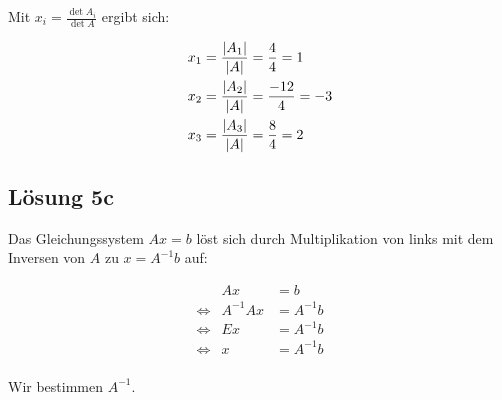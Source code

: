 \documentclass[main.tex]{subfiles}
\begin{document}
Mit $x_i = \frac{\det A_i}{\det A}$ ergibt sich:

\begin{align*}
    x_1 &= \frac{\lvert A_1\rvert}{\lvert A\rvert} = \frac{4}{4} = 1 \\
    x_2 &= \frac{\lvert A_2\rvert}{\lvert A\rvert} = \frac{-12}{4} = -3 \\
    x_3 &= \frac{\lvert A_3\rvert}{\lvert A\rvert} = \frac{8}{4} = 2 \\
\end{align*}

\subsection{Lösung 5c}
\renewcommand{\equiv}{\Leftrightarrow}

Das Gleichungssystem $Ax=b$ löst sich durch Multiplikation von links mit dem Inversen von $A$ zu $x=A^{-1}b$ auf:

\begin{equation*}
\begin{array}{rrl}
        & Ax &= b \\
\equiv  & A^{-1} A x &= A^{-1} b \\
\equiv  & E x &= A^{-1} b \\
\equiv  & x &= A^{-1} b \\
\end{array}
\end{equation*}

Wir bestimmen $A^{-1}$.
\end{document}
